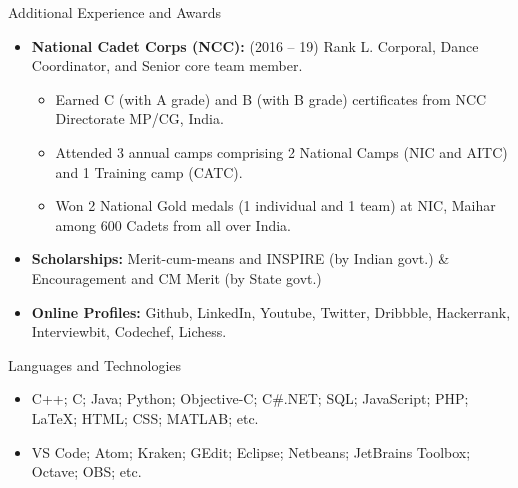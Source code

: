 \documentclass[]{mcdowellcv}
\begin{document}
	\begin{cvsection}{Additional Experience and Awards}
		\begin{cvsubsection}{}{}{}	
			\begin{itemize}
				\item \textbf{National Cadet Corps (NCC):} (2016 -- 19) Rank L. Corporal, Dance Coordinator, and Senior core team member.
					\begin{itemize}
						\item Earned C (with A grade) and B (with B grade) certificates from NCC Directorate MP/CG, India.
						\item Attended 3 annual camps comprising 2 National Camps (NIC and AITC) and 1 Training camp (CATC).
						\item Won 2 National Gold medals (1 individual and 1 team) at NIC, Maihar among 600 Cadets from all over India.
					\end{itemize}
				\item \textbf{Scholarships:} Merit-cum-means and INSPIRE (by Indian govt.) \& Encouragement and CM Merit (by State govt.)
				
				\item \textbf{Online Profiles:} Github, LinkedIn, Youtube, Twitter, Dribbble, Hackerrank, Interviewbit, Codechef, Lichess.
			\end{itemize}
		\end{cvsubsection}
	\end{cvsection}

	\begin{cvsection}{Languages and Technologies}
		\begin{cvsubsection}{}{}{}	
			\begin{itemize}
				\item C++; C; Java; Python; Objective-C; C\#.NET; SQL; JavaScript; PHP; \LaTeX; HTML; CSS; MATLAB; etc.
				\item VS Code; Atom; Kraken; GEdit; Eclipse; Netbeans; JetBrains Toolbox; Octave; OBS; etc.
			\end{itemize}
		\end{cvsubsection}
	\end{cvsection}
\end{document}
